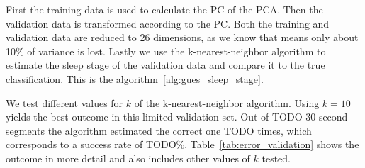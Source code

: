 First the training data is used to calculate the PC of the PCA. Then the validation data is transformed according to the PC. Both the training and validation data are reduced to 26 dimensions, as we know that means only about 10\% of variance is lost. Lastly we use the k-nearest-neighbor algorithm to estimate the sleep stage of the validation data and compare it to the true classification. This is the algorithm~\ref{alg:gues_sleep_stage}.

We test different values for $k$ of the k-nearest-neighbor algorithm. Using $k=10$ yields the best outcome in this limited validation set. Out of TODO 30 second segments the algorithm estimated the correct one TODO times, which corresponds to a success rate of TODO\%. Table~\ref{tab:error_validation} shows the outcome in more detail and also includes other values of $k$ tested.

